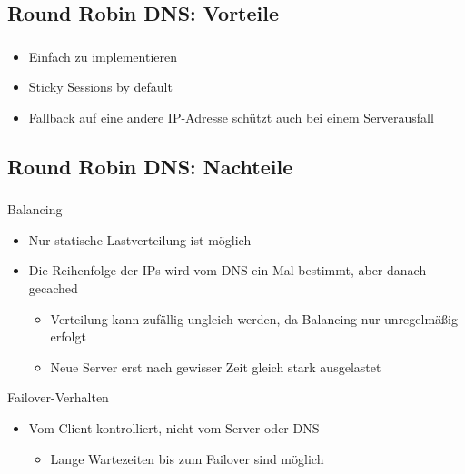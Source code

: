 \subsection{Round Robin DNS: Vorteile}
\begin{frame}
    \frametitle{\insertsection}
    \framesubtitle{\insertsubsection}
    
    \begin{itemize}
    	\item Einfach zu implementieren
    	\item Sticky Sessions by default
    	\item Fallback auf eine andere IP-Adresse schützt auch bei einem Serverausfall
    \end{itemize}
\end{frame}

\subsection{Round Robin DNS: Nachteile}
\begin{frame}
    \frametitle{\insertsection}
    \framesubtitle{\insertsubsection}
    
    \begin{block}{Balancing}
	    \begin{itemize}
	    	\item Nur statische Lastverteilung ist möglich
	    	\item Die Reihenfolge der IPs wird vom DNS ein Mal bestimmt, aber danach gecached
	    	\begin{itemize}
	    		\item Verteilung kann zufällig ungleich werden, da Balancing nur unregelmäßig erfolgt
	    		\item Neue Server erst nach gewisser Zeit gleich stark ausgelastet
	    	\end{itemize}
	    \end{itemize}
    \end{block}
    
    \begin{block}{Failover-Verhalten}
	    \begin{itemize}
	    	\item Vom Client kontrolliert, nicht vom Server oder DNS
	    	\begin{itemize}
	    		\item Lange Wartezeiten bis zum Failover sind möglich
	    	\end{itemize}
	    \end{itemize}
    \end{block}

\end{frame}

